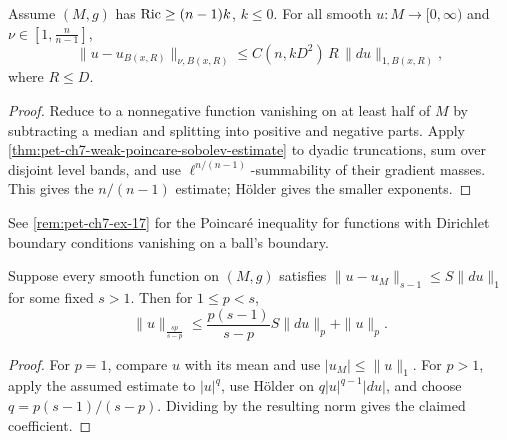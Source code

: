\begin{theorem}
  \label{thm:pet-ch7-poincare-sobolev}
  Assume $(M,g)$ has $\operatorname{Ric}\ge(n-1)k$, $k\le0$. For all smooth $u:M\to[0,\infty)$
  and $\nu\in[1,\tfrac{n}{n-1}]$,
  \[
    \|u-u_{B(x,R)}\|_{\nu,B(x,R)}\le C(n,kD^2)\,R\,\|du\|_{1,B(x,R)},
  \]
  where $R\le D$.
\end{theorem}
\begin{proof}
  \sketch
  Reduce to a nonnegative function vanishing on at least half of \(M\) by subtracting a median and splitting into positive and negative parts. Apply \cref{thm:pet-ch7-weak-poincare-sobolev-estimate} to dyadic truncations, sum over disjoint level bands, and use \(\ell^{n/(n-1)}\)-summability of their gradient masses. This gives the \(n/(n-1)\) estimate; Hölder gives the smaller exponents.
\end{proof}

\begin{remark}
  \label{rem:pet-ch7-dirichlet-poincare}
  See \cref{rem:pet-ch7-ex-17} for the Poincaré inequality for functions with
  Dirichlet boundary conditions vanishing on a ball's boundary.
\end{remark}

\begin{proposition}
  \label{prop:pet-ch7-sobolev-hierarchy}
  Suppose every smooth function on $(M,g)$ satisfies $\|u-u_M\|_{s-1}\le
  S\|du\|_1$ for some fixed $s>1$. Then for $1\le p<s$,
  \[
    \|u\|_{\frac{sp}{s-p}}\le\frac{p(s-1)}{s-p}S\|du\|_p+\|u\|_p.
  \]
\end{proposition}
\begin{proof}
  \sketch
  For \(p=1\), compare \(u\) with its mean and use \(|u_M|\le\|u\|_1\). For \(p>1\), apply the assumed estimate to \(|u|^q\), use Hölder on \(q|u|^{q-1}|du|\), and choose \(q=p(s-1)/(s-p)\). Dividing by the resulting norm gives the claimed coefficient.
\end{proof}

